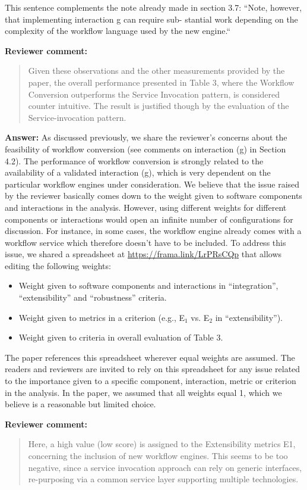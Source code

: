 \documentclass[a4]{letter}
\newenvironment{review}%
{\textbf{Reviewer comment:}\begin{quote}}%
{\end{quote}}%
\newcommand{\answer}[1]{\textbf{Answer:} #1}
\begin{document}
\begin{letter}{}
This sentence complements the note already made in section 3.7:
``Note, however,
that implementing interaction g can require sub-
stantial work depending on the complexity of the
workflow language used by the new engine.``

\begin{review}
 Given these observations and the other measurements provided by the paper, the overall performance presented in Table 3, where the Workflow Conversion outperforms the Service Invocation pattern, is considered counter intuitive. The result is justified though by the evaluation of the Service-invocation pattern.
\end{review}

\answer{As discussed previously, we share the reviewer's concerns
  about the feasibility of workflow conversion (see comments on
  interaction (g) in Section 4.2). The performance of workflow
  conversion is strongly related to the availability of a validated
  interaction (g), which is very dependent on the particular workflow
  engines under consideration. We believe that the issue raised by the
  reviewer basically comes down to the weight given to software
  components and interactions in the analysis. However, using
  different weights for different components or interactions would
  open an infinite number of configurations for discussion. For
  instance, in some cases, the workflow engine already comes with a
  workflow service which therefore doesn't have to be included. To
  address this issue, we shared a spreadsheet at
  \url{https://frama.link/LrPRsCQp} that allows editing the following
  weights:
  \begin{itemize}
  \item Weight given to software components and interactions in
  ``integration'', ``extensibility'' and ``robustness'' criteria.
  \item Weight given to metrics in a criterion (e.g., E$_1$ vs. E$_2$ in
  ``extensibility'').
  \item Weight given to criteria in overall evaluation of Table 3.
\end{itemize}
The paper references this spreadsheet wherever equal weights are
assumed. The readers and reviewers are invited to rely on this
spreadsheet for any issue related to the importance given to a
specific component, interaction, metric or criterion in the
analysis. In the paper, we assumed that all weights equal 1, which we
believe is a reasonable but limited choice.
}

\begin{review}
  Here, a high value (low score) is assigned to the Extensibility
  metrics E1, concerning the inclusion of new workflow engines. This
  seems to be too negative, since a service invocation approach can
  rely on generic interfaces, re-purposing via a common service layer
  supporting multiple technologies.
\end{review}


\end{letter}
\end{document}
